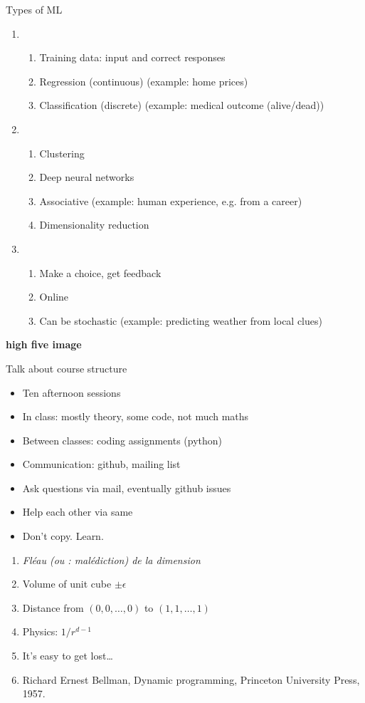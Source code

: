 \documentclass{article}
\begin{document}
Types of ML
\begin{enumerate}
\item {}
  \begin{enumerate}
  \item Training data: input and correct responses
  \item Regression (continuous) (example: home prices)
  \item Classification (discrete) (example: medical outcome (alive/dead))
  \end{enumerate}
\item {}
  \begin{enumerate}
  \item Clustering
  \item Deep neural networks
  \item Associative (example: human experience, e.g. from a career)
  \item Dimensionality reduction
  \end{enumerate}
\item {}
  \begin{enumerate}
  \item Make a choice, get feedback
  \item Online
  \item Can be stochastic (example: predicting weather from local clues)
  \end{enumerate}
\end{enumerate}

\textbf{high five image}

Talk about course structure
\begin{itemize}
\item Ten afternoon sessions
\item In class: mostly theory, some code, not much maths
\item Between classes: coding assignments (python)
\item Communication: github, mailing list
\item Ask questions via mail, eventually github issues
\item Help each other via same
\item Don't copy.  Learn.
\end{itemize}

\begin{enumerate}
\item \textit{Fléau (ou : malédiction) de la dimension}
\item Volume of unit cube $\pm\epsilon$
\item Distance from $(0,0,\ldots,0)$ to $(1,1,\ldots,1)$
\item Physics: $1/r^{d-1}$
\item It's easy to get lost\dots
\item Richard Ernest Bellman, Dynamic programming, Princeton
  University Press, 1957.
\end{enumerate}
\end{document}
